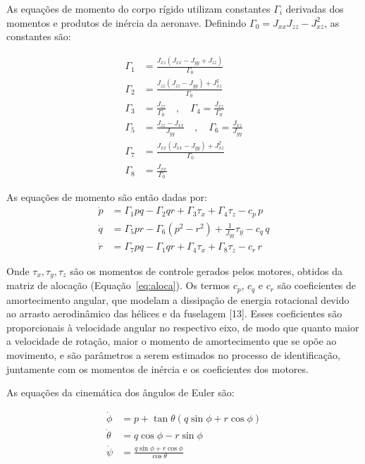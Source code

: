 \documentclass[letterpaper, 10 pt, conference]{ieeeconf}
\begin{document}
As equações de momento do corpo rígido utilizam constantes $\Gamma_i$ derivadas dos momentos e produtos de inércia da aeronave. Definindo $\Gamma_0 = J_{xx} J_{zz} - J_{xz}^2$, as constantes são:

\begin{align}
\Gamma_1 &= \frac{J_{xz}(J_{xx} - J_{yy} + J_{zz})}{\Gamma_0} \\
\Gamma_2 &= \frac{J_{zz}(J_{zz} - J_{yy}) + J_{xz}^2}{\Gamma_0} \\
\Gamma_3 &= \frac{J_{zz}}{\Gamma_0} \quad , \quad
\Gamma_4 = \frac{J_{xz}}{\Gamma_0} \\
\Gamma_5 &= \frac{J_{zz} - J_{xx}}{J_{yy}} \quad , \quad
\Gamma_6 = \frac{J_{xz}}{J_{yy}} \\
\Gamma_7 &= \frac{J_{xx}(J_{xx} - J_{yy}) + J_{xz}^2}{\Gamma_0} \\
\Gamma_8 &= \frac{J_{xx}}{\Gamma_0}
\end{align}

As equações de momento são então dadas por:
\begin{align}
\dot{p} &= \Gamma_1 pq - \Gamma_2 qr + \Gamma_3 \tau_x + \Gamma_4 \tau_z - c_p\, p \\
\dot{q} &= \Gamma_5 pr - \Gamma_6 (p^2 - r^2) + \frac{1}{J_{yy}}\tau_y - c_q\, q \\
\dot{r} &= \Gamma_7 pq - \Gamma_1 qr + \Gamma_4 \tau_x + \Gamma_8 \tau_z - c_r\, r
\end{align}

Onde $\tau_x, \tau_y, \tau_z$ são os momentos de controle gerados pelos motores, obtidos da matriz de alocação (Equação~\eqref{eq:aloca}). Os termos $c_p$, $c_q$ e $c_r$ são coeficientes de amortecimento angular, que modelam a dissipação de energia rotacional devido ao arrasto aerodinâmico das hélices e da fuselagem [13]. Esses coeficientes são proporcionais à velocidade angular no respectivo eixo, de modo que quanto maior a velocidade de rotação, maior o momento de amortecimento que se opõe ao movimento, e são parâmetros a serem estimados no processo de identificação, juntamente com os momentos de inércia e os coeficientes dos motores.

As equações da cinemática dos ângulos de Euler são:

\begin{align}
\dot{\phi} &= p + \tan\theta(q\sin\phi + r\cos\phi) \\
\dot{\theta} &= q\cos\phi - r\sin\phi \\
\dot{\psi} &= \frac{q\sin\phi + r\cos\phi}{\cos\theta}
\end{align}
\end{document}
